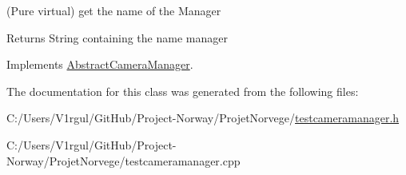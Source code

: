 (Pure virtual) get the name of the Manager 

\begin{DoxyReturn}{Returns}
String containing the name manager 
\end{DoxyReturn}


Implements \hyperlink{class_abstract_camera_manager_a6e4b041842471b9ed42ddd5c9ab260d1}{Abstract\-Camera\-Manager}.



The documentation for this class was generated from the following files\-:\begin{DoxyCompactItemize}
\item 
C\-:/\-Users/\-V1rgul/\-Git\-Hub/\-Project-\/\-Norway/\-Projet\-Norvege/\hyperlink{testcameramanager_8h}{testcameramanager.\-h}\item 
C\-:/\-Users/\-V1rgul/\-Git\-Hub/\-Project-\/\-Norway/\-Projet\-Norvege/testcameramanager.\-cpp\end{DoxyCompactItemize}
